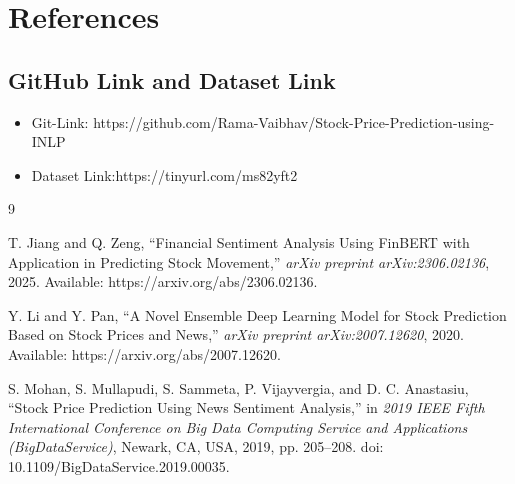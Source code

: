\documentclass[11pt]{article}
\begin{document}
\section{References}
\subsection{GitHub Link and Dataset Link}
\begin{itemize}
  \item Git-Link: https://github.com/Rama-Vaibhav/Stock-Price-Prediction-using-INLP
  \item Dataset Link:https://tinyurl.com/ms82yft2
\end{itemize}

\begin{thebibliography}{9}

T. Jiang and Q. Zeng, 
``Financial Sentiment Analysis Using FinBERT with Application in Predicting Stock Movement,'' 
\textit{arXiv preprint arXiv:2306.02136}, 2025. 
Available: https://arxiv.org/abs/2306.02136.

Y. Li and Y. Pan, 
``A Novel Ensemble Deep Learning Model for Stock Prediction Based on Stock Prices and News,'' 
\textit{arXiv preprint arXiv:2007.12620}, 2020. 
Available: https://arxiv.org/abs/2007.12620.

S. Mohan, S. Mullapudi, S. Sammeta, P. Vijayvergia, and D. C. Anastasiu, 
``Stock Price Prediction Using News Sentiment Analysis,'' 
in \textit{2019 IEEE Fifth International Conference on Big Data Computing Service and Applications (BigDataService)}, 
Newark, CA, USA, 2019, pp. 205--208. 
doi: 10.1109/BigDataService.2019.00035.

\end{thebibliography}
\end{document}
